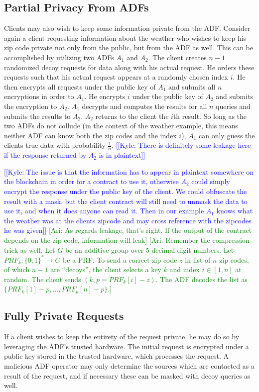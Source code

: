 \documentclass{article}
\newcommand{\kyle}[1]{\textcolor{blue}{[[\textsf{Kyle:  #1}]]}}
\newcommand{\ari}[1]{\textcolor{green}{[\textsf{Ari:  #1}]}}
\begin{document}
\subsection{Partial Privacy From ADFs}
    Clients may also wish to keep some information private from the ADF.  Consider again a client requesting information about the weather who wishes to keep his zip code private not only from the public, but from the ADF as well.  This can be accomplished by utilizing two ADFs $A_1$ and $A_2$.  The client creates $n-1$ randomized decoy requests for data along with his actual request.  He orders these requests such that his actual request appears at a randomly chosen index $i$.  He then encrypts all requests under the public key of $A_1$ and submits all $n$ encryptions in order to $A_1$.  He encrypts $i$ under the public key of $A_2$ and submits the encryption to $A_2$.  $A_1$ decrypts and computes the results for all $n$ queries and submits the results to $A_2$.  $A_2$ returns to the client the $i$th result.  So long as the two ADFs do not collude (in the context of the weather example, this means neither ADF can know both the zip codes and the index $i$), $A_1$ can only guess the clients true data with probability $\frac{1}{n}$.  \kyle{There is definitely some leakage here if the response returned by $A_2$ is in plaintext} 
    
    
    \kyle{The issue is that the information has to appear in plaintext somewhere on the blockchain in order for a contract to use it, otherwise $A_2$ could simply encrypt the response under the public key of the client.  We could obfuscate the result with a mask, but the client contract will still need to unmask the data to use it, and when it does anyone can read it.  Then in our example $A_1$ knows what the weather was at the clients zipcode and may cross reference with the zipcodes he was given}
    \ari{As regards leakage, that's right. If the output of the contract depends on the zip code, information will leak}
    \ari{Remember the compression trick as well. Let $G$ be an additive group over 5-decimal-digit numbers. Let $PRF_k: \{0,1\}^{*} \rightarrow G$ be a PRF. To send a correct zip code $z$ in list of $n$ zip codes, of which $n-1$ are ``decoys'', the client selects a key $k$ and index $i \in [1,n]$ at random. The client sends $(k,p = PRF_k[i] - z)$. The ADF decodes the list as $\{PRF_k[1] - p, \ldots, PRF_k[n]  - p\}$.}

\subsection{Fully Private Requests}
    If a client wishes to keep the entirety of the request private, he may do so by leveraging the ADF's trusted hardware.  The initial request is encrypted under a public key stored in the trusted hardware, which processes the request.  A malicious ADF operator may only determine the sources which are contacted as a result of the request, and if necessary these can be masked with decoy queries as well.
\end{document}
